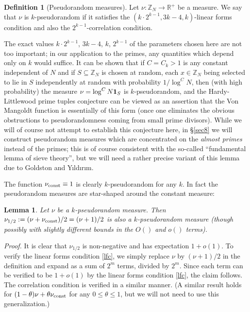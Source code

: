 \documentclass[12pt,a4paper,reqno]{amsart}
\numberwithin{equation}{section}
\theoremstyle{plain}
\newtheorem{lemma}[subsection]{Lemma}
\theoremstyle{definition}
\newtheorem{definition}[subsection]{Definition}
\renewcommand{\leq}{\leqslant}
\def\vconst{\ensuremath \nu_{\mbox{\scriptsize const}}}
\def\vconstlem{\ensuremath \nu_{\mbox{\scriptsize \textup{const}}}}
\def\vs{\vspace{11pt}}
\def\ni{\noindent}
\def\proof{\noindent\textit{Proof. }}
\def\endproof{\hfill{\usebox{\proofbox}}}
\def\emph#1{{\it #1}}
\begin{document}
\begin{definition}[Pseudorandom measures]\label{mu-pseudo-def}
Let $\nu : \mathbb{Z}_N \rightarrow \mathbb{R}^{+}$ be a measure. We say that $\nu$ is $k$-pseudorandom if it satisfies the $(k\cdot 2^{k-1},3k - 4,k)$-linear forms condition and also the $2^{k-1}$-correlation condition.
\end{definition}

\ni\emph{Remarks.} The exact values $k \cdot 2^{k-1}$, $3k-4$, $k$, $2^{k-1}$ of the parameters chosen here
are not too important; in our application to the primes, any quantities
which depend only on $k$ would suffice.  It can be shown that if $C = C_k > 1$ is any constant independent of $N$ and if $S \subseteq \mathbb{Z}_N$ is chosen at random, each $x \in \mathbb{Z}_N$ being selected to lie in $S$ independently at random with probability $1/\log^C N$, then (with high probability) the measure $\nu = \log^C N {\bf 1}_S$ is $k$-pseudorandom, and the Hardy-Littlewood prime tuples conjecture can be viewed as an assertion that the Von Mangoldt function is essentially of this form (once one eliminates the obvious obstructions to pseudorandomness coming from small prime divisors). While we will of course not attempt to establish this conjecture here, in \S \ref{sec8} we will construct pseudorandom measures which are concentrated on the \emph{almost primes} instead of the primes; this is of course consistent with the so-called ``fundamental lemma of sieve theory'',
but we will need a rather precise variant of this lemma due to Goldston and Y{\i}ld{\i}r{\i}m. \vs

\ni The function $\vconst \equiv 1$ is clearly $k$-pseudorandom for any $k$.  In fact the pseudorandom measures are star-shaped
around the constant measure:

\begin{lemma}\label{halfway}  Let $\nu$ be a $k$-pseudorandom measure.  Then $\nu_{1/2} := (\nu + \vconstlem)/2 = (\nu + 1)/2$ is also a $k$-pseudorandom measure \textup{(}though possibly with slightly different bounds in the $O()$ and $o()$ terms\textup{)}.
\end{lemma}

\proof It is clear that $\nu_{1/2}$ is non-negative and has expectation $1 + o(1)$.  To verify the linear forms condition \eqref{lfc}, we simply
replace $\nu$ by $(\nu+1)/2$ in the definition and expand as a sum of $2^m$ terms, divided by $2^m$.  Since each term can be verified to be
$1 + o(1)$ by the linear forms condition \eqref{lfc}, the claim follows.  The correlation condition is verified
in a similar manner.  (A similar result holds for $(1-\theta) \nu + \theta \vconst$ for any $0 \leq \theta \leq 1$, but we will not need to use
this generalization.)\endproof\vs
\end{document}
